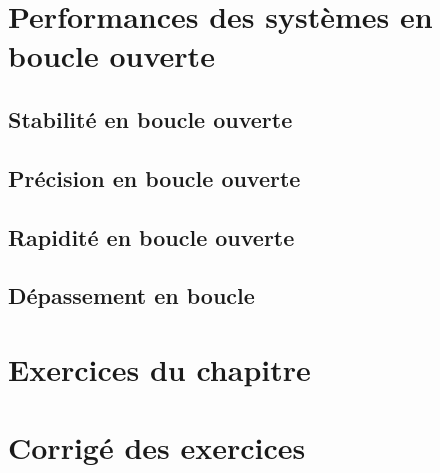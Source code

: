 \section{Performances des systèmes en boucle ouverte}

\subsection{Stabilité en boucle ouverte}

\subsection{Précision en boucle ouverte}

\subsection{Rapidité en boucle ouverte}

\subsection{Dépassement en boucle }



\newpage
\section*{Exercices du chapitre}


\exercice{}
\question

\newpage
\section*{Corrigé des exercices}


